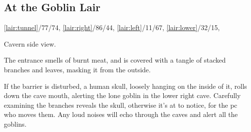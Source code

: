 \documentclass[10pt,twoside]{book}
\begin{document}

\subsection{At the Goblin Lair}
%
  {%
    \ref{lair:tunnel}/77/74,
    \ref{lair:right}/86/44,
    \ref{lair:left}/11/67,
    \ref{lair:lower}/32/15,
  }%
{Cavern side view.\par\null}
The entrance smells of burnt meat, and is covered with a tangle of stacked branches and leaves, masking it from the outside.

If the barrier is disturbed, a human skull, loosely hanging on the inside of it, rolls down the cave mouth, alerting the lone goblin in the lower right cave.
Carefully examining the branches reveals the skull, otherwise it's  at \tn[8] to notice, for the \gls{pc} who moves them.
Any loud noises will echo through the caves and alert all the goblins.

\end{document}
